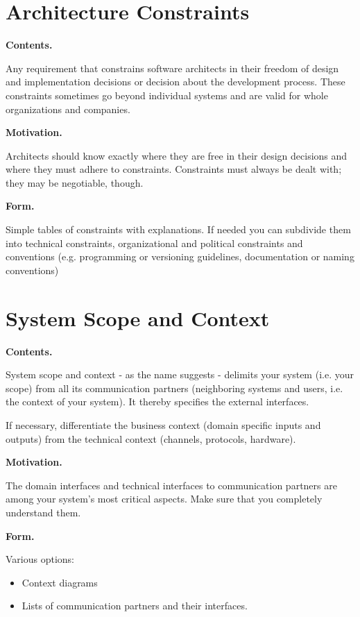 \documentclass[]{article}
\begin{document}
\hypertarget{section-architecture-constraints}{%
\section{Architecture
Constraints}\label{section-architecture-constraints}}

\textbf{Contents.}

Any requirement that constrains software architects in their freedom of
design and implementation decisions or decision about the development
process. These constraints sometimes go beyond individual systems and
are valid for whole organizations and companies.

\textbf{Motivation.}

Architects should know exactly where they are free in their design
decisions and where they must adhere to constraints. Constraints must
always be dealt with; they may be negotiable, though.

\textbf{Form.}

Simple tables of constraints with explanations. If needed you can
subdivide them into technical constraints, organizational and political
constraints and conventions (e.g. programming or versioning guidelines,
documentation or naming conventions)

\hypertarget{section-system-scope-and-context}{%
\section{System Scope and
Context}\label{section-system-scope-and-context}}

\textbf{Contents.}

System scope and context - as the name suggests - delimits your system
(i.e. your scope) from all its communication partners (neighboring
systems and users, i.e. the context of your system). It thereby
specifies the external interfaces.

If necessary, differentiate the business context (domain specific inputs
and outputs) from the technical context (channels, protocols, hardware).

\textbf{Motivation.}

The domain interfaces and technical interfaces to communication partners
are among your system's most critical aspects. Make sure that you
completely understand them.

\textbf{Form.}

Various options:

\begin{itemize}
\item
  Context diagrams
\item
  Lists of communication partners and their interfaces.
\end{itemize}
\end{document}
